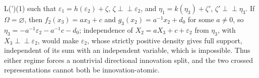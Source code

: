 L(\zeta')\in{}(1)\) such that \(\varepsilon_1=h(\varepsilon_2)+\zeta\), \(\zeta\perp\!\!\!\perp\varepsilon_2\), and \(\eta_1=k(\eta_3)+\zeta'\), \(\zeta'\perp\!\!\!\perp\eta_3\). If \(\Omega=\varnothing\), then \(f_2(x_3)=ax_3+c\) and \(g_3(x_2)=a^{-1}x_2+d_0\) for some \(a\neq0\), so \(\eta_3=-a^{-1}\varepsilon_2-a^{-1}c-d_0\); independence of \(X_2=aX_3+c+\varepsilon_2\) from \(\eta_3\), with \(X_3\perp\!\!\!\perp\varepsilon_2\), would make \(\varepsilon_2\), whose strictly positive density gives full support, independent of its sum with an independent variable, which is impossible. Thus either regime forces a nontrivial directional innovation split, and the two crossed representations cannot both be innovation-atomic.